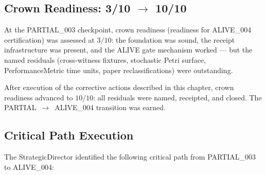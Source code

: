 \subsection{Crown Readiness: 3/10 \texorpdfstring{$\to$}{->} 10/10}

At the PARTIAL\_003 checkpoint, crown readiness (readiness for ALIVE\_004
certification) was assessed at $3/10$: the foundation was sound, the receipt
infrastructure was present, and the ALIVE gate mechanism worked --- but the
named residuals (cross-witness fixtures, stochastic Petri surface,
PerformanceMetric time units, paper reclassifications) were outstanding.

After execution of the corrective actions described in this chapter, crown
readiness advanced to $10/10$: all residuals were named, receipted, and
closed. The PARTIAL~$\to$~ALIVE\_004 transition was earned.

\subsection{Critical Path Execution}

The StrategicDirector identified the following critical path from PARTIAL\_003
to ALIVE\_004:

